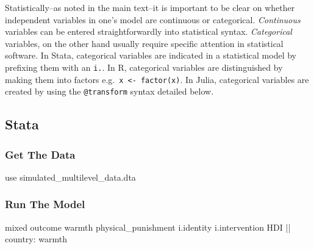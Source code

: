 \documentclass[
  letterpaper,
  DIV=11,
  numbers=noendperiod]{scrreprt}
\newenvironment{Shaded}{\begin{snugshade}}{\end{snugshade}}
\newcommand{\KeywordTok}[1]{\textcolor[rgb]{0.00,0.23,0.31}{#1}}
\newcommand{\NormalTok}[1]{\textcolor[rgb]{0.00,0.23,0.31}{#1}}
\begin{document}
\begin{tcolorbox}[enhanced jigsaw, toprule=.15mm, colback=white, titlerule=0mm, leftrule=.75mm, rightrule=.15mm, opacityback=0, arc=.35mm, bottomrule=.15mm, colbacktitle=quarto-callout-warning-color!10!white, left=2mm, colframe=quarto-callout-warning-color-frame, bottomtitle=1mm, toptitle=1mm, coltitle=black, breakable, title=\textcolor{quarto-callout-warning-color}{\faExclamationTriangle}\hspace{0.5em}{Continuous and Categorical Variables}, opacitybacktitle=0.6]

Statistically--as noted in the main text--it is important to be clear on
whether independent variables in one's model are continuous or
categorical. \emph{Continuous} variables can be entered
straightforwardly into statistical syntax. \emph{Categorical} variables,
on the other hand usually require specific attention in statistical
software. In Stata, categorical variables are indicated in a statistical
model by prefixing them with an \texttt{i.}. In R, categorical variables
are distinguished by making them into factors
e.g.~\texttt{x\ \textless{}-\ factor(x)}. In Julia, categorical
variables are created by using the \texttt{@transform} syntax detailed
below.

\end{tcolorbox}

\subsection{Stata}

\subsubsection{Get The Data}\label{get-the-data}

\begin{Shaded}
\begin{Highlighting}[]

\KeywordTok{use}\NormalTok{ simulated\_multilevel\_data.dta}
\end{Highlighting}
\end{Shaded}

\subsubsection{Run The Model}\label{run-the-model}

\begin{Shaded}
\begin{Highlighting}[]
\NormalTok{mixed outcome warmth physical\_punishment i.}\KeywordTok{identity}\NormalTok{ i.intervention HDI || country: warmth}
\end{Highlighting}
\end{Shaded}
\end{document}
